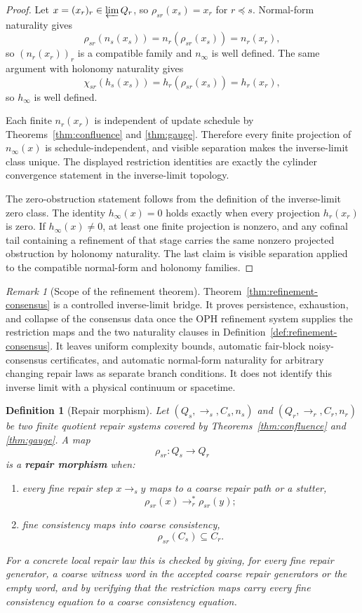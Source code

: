 \documentclass[11pt]{article}
\newtheorem{definition}[theorem]{Definition}
\theoremstyle{remark}
\newtheorem{remark}[theorem]{Remark}
\theoremstyle{plain}
\begin{document}
\begin{proof}
Let \(x=(x_r)_r\in\varprojlim Q_r\), so \(\rho_{sr}(x_s)=x_r\) for \(r\preceq s\). Normal-form
naturality gives
\[
\rho_{sr}(n_s(x_s))
=
n_r(\rho_{sr}(x_s))
=
n_r(x_r),
\]
so \((n_r(x_r))_r\) is a compatible family and \(n_\infty\) is well defined. The same argument
with holonomy naturality gives
\[
\chi_{sr}(h_s(x_s))
=
h_r(\rho_{sr}(x_s))
=
h_r(x_r),
\]
so \(h_\infty\) is well defined.

Each finite \(n_r(x_r)\) is independent of update schedule by Theorems~\ref{thm:confluence} and
\ref{thm:gauge}. Therefore every finite projection of \(n_\infty(x)\) is schedule-independent,
and visible separation makes the inverse-limit class unique. The displayed restriction identities
are exactly the cylinder convergence statement in the inverse-limit topology.

The zero-obstruction statement follows from the definition of the inverse-limit zero class. The
identity \(h_\infty(x)=0\) holds exactly when every projection \(h_r(x_r)\) is zero. If
\(h_\infty(x)\ne0\), at least one finite projection is nonzero, and any cofinal tail containing a
refinement of that stage carries the same nonzero projected obstruction by holonomy naturality.
The last claim is visible separation applied to the compatible normal-form and holonomy families.
\end{proof}

\begin{remark}[Scope of the refinement theorem]\label{rem:refinement-consensus}
Theorem~\ref{thm:refinement-consensus} is a controlled inverse-limit bridge. It proves persistence,
exhaustion, and collapse of the consensus data once the OPH refinement system supplies the
restriction maps and the two naturality clauses in Definition~\ref{def:refinement-consensus}. It
leaves uniform complexity bounds, automatic fair-block noisy-consensus certificates, and
automatic normal-form naturality for arbitrary changing repair laws as separate branch conditions.
It does not identify this inverse limit with a physical continuum or spacetime.
\end{remark}

\begin{definition}[Repair morphism]\label{def:repair-morphism}
Let \((Q_s,\to_s,C_s,n_s)\) and \((Q_r,\to_r,C_r,n_r)\) be two finite quotient repair systems
covered by Theorems~\ref{thm:confluence} and \ref{thm:gauge}. A map
\[
\rho_{sr}:Q_s\to Q_r
\]
is a \textbf{repair morphism} when:
\begin{enumerate}[label=(\roman*),leftmargin=2em]
\item every fine repair step \(x\to_s y\) maps to a coarse repair path or a stutter,
\[
\rho_{sr}(x)\to_r^*\rho_{sr}(y);
\]
\item fine consistency maps into coarse consistency,
\[
\rho_{sr}(C_s)\subseteq C_r.
\]
\end{enumerate}
For a concrete local repair law this is checked by giving, for every fine repair generator, a
coarse witness word in the accepted coarse repair generators or the empty word, and by verifying
that the restriction maps carry every fine consistency equation to a coarse consistency equation.
\end{definition}
\end{document}
